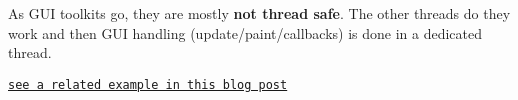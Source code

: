 As G\+UI toolkits go, they are mostly {\bfseries not thread safe}. The other threads do they work and then G\+UI handling (update/paint/callbacks) is done in a dedicated thread.
\begin{DoxyItemize}
\item \href{https://www.theimpossiblecode.com/blog/faster-opencv-smiles-tbb}{\tt see a related example in this blog post} 
\end{DoxyItemize}